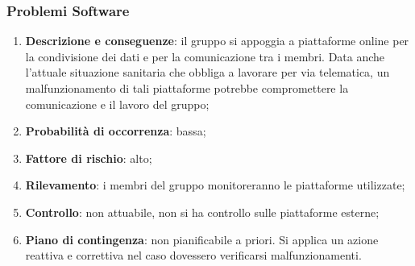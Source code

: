 	\subsubsection{Problemi Software}
	\begin{enumerate}
		\item \textbf{Descrizione e conseguenze}: il gruppo si appoggia a piattaforme online per la condivisione dei dati e per la comunicazione tra i membri. Data anche l'attuale situazione sanitaria che obbliga a lavorare per via telematica, un malfunzionamento di tali piattaforme potrebbe compromettere la comunicazione e il lavoro del gruppo;
		\item \textbf{Probabilità di occorrenza}: bassa;
		\item \textbf{Fattore di rischio}: alto;
		\item \textbf{Rilevamento}: i membri del gruppo monitoreranno le piattaforme utilizzate;
		\item \textbf{Controllo}: non attuabile, non si ha controllo sulle piattaforme esterne; 
		\item \textbf{Piano di contingenza}: non pianificabile a priori. Si applica un azione reattiva e correttiva nel caso dovessero verificarsi malfunzionamenti.
	\end{enumerate}		